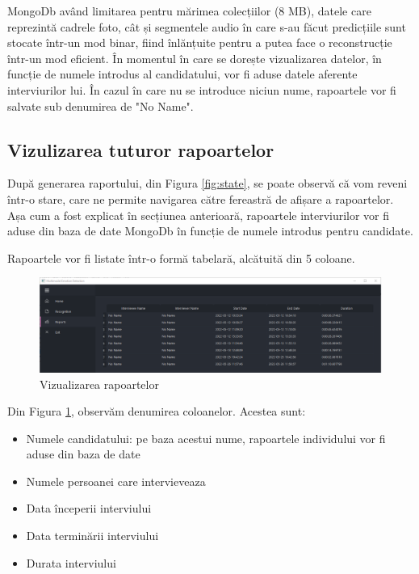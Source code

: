 \documentclass[a4paper, 12pt]{report}
\begin{document}
	MongoDb având limitarea pentru mărimea colecțiilor (8 MB), datele care reprezintă cadrele foto, cât și segmentele audio în care s-au făcut predicțiile sunt stocate într-un mod binar, fiind înlănțuite pentru a putea face o reconstrucție într-un mod eficient. În momentul în care se dorește vizualizarea datelor, în funcție de numele introdus al candidatului, vor fi aduse datele aferente interviurilor lui. În cazul în care nu se introduce niciun nume, rapoartele vor fi salvate sub denumirea de "No Name".
	\clearpage
	\subsection{Vizulizarea tuturor rapoartelor}
	După generarea raportului, din Figura \ref{fig:state}, se poate observă că vom reveni într-o stare, care ne permite navigarea către fereastră de afișare a rapoartelor. Așa cum a fost explicat în secțiunea anterioară, rapoartele interviurilor vor fi aduse din baza de date MongoDb în funcție de numele introdus pentru candidate.
	
	Rapoartele vor fi listate într-o formă tabelară, alcătuită din 5 coloane.
	
	\begin{figure}[H]
		\begin{center}
			\includegraphics[scale=0.35]{images/reports.png}
		\end{center}
		\caption{Vizualizarea rapoartelor}
		\label{fig:emotion_reports}
	\end{figure}

	Din Figura \ref{fig:emotion_reports}, observăm denumirea coloanelor. Acestea sunt:
	
	\begin{itemize}
		\item Numele candidatului: pe baza acestui nume, rapoartele individului vor fi aduse din baza de date
		\item Numele persoanei care intervieveaza
		\item Data începerii interviului
		\item Data terminării interviului
		\item Durata interviului
	\end{itemize}
	
\end{document}
